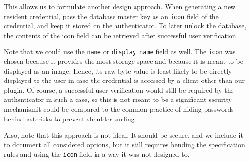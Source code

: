 This allows us to formulate another design approach. When generating a new resident credential,
pass the database master key as an \texttt{icon} field of the credential, and keep it stored on the authenticator.
To later unlock the database, the contents of the icon field can be retrieved after successful user verification.

Note that we could use the \texttt{name} or \texttt{display name} field as well.
The \texttt{icon} was chosen because it provides the most storage space and because it is meant to be
displayed as an image. Hence, its raw byte value is least likely to be directly displayed to the user
in case the credential is accessed by a client other than our plugin.
Of course, a successful \gls{user verification} would still be required by the authenticator in such a case,
so this is not meant to be a significant security mechanism\textemdash it could be compared to the common
practice of hiding passwords behind asterisks to prevent shoulder surfing.

Also, note that this approach is not ideal. It should be secure, and we include it to document all considered options,
but it still requires bending the specification rules and using the \texttt{icon} field in a way it was not designed to.

